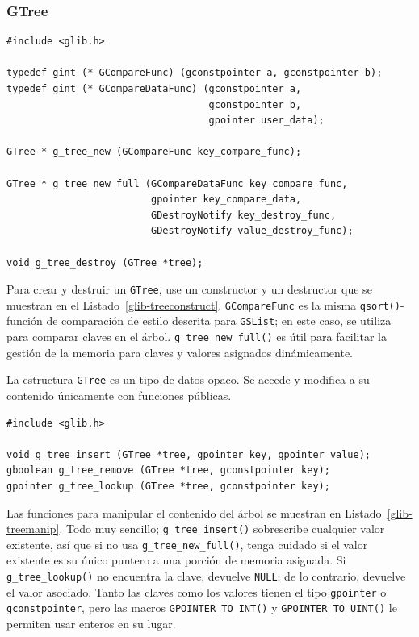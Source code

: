 \subsubsection{GTree}

\begin{lstlisting}[float, caption={Creating and destroying balanced binary trees}, label=glib-treeconstruct]
#include <glib.h>

typedef gint (* GCompareFunc) (gconstpointer a, gconstpointer b);
typedef gint (* GCompareDataFunc) (gconstpointer a,
                                   gconstpointer b,
                                   gpointer user_data);

GTree * g_tree_new (GCompareFunc key_compare_func);

GTree * g_tree_new_full (GCompareDataFunc key_compare_func,
                         gpointer key_compare_data,
                         GDestroyNotify key_destroy_func,
                         GDestroyNotify value_destroy_func);

void g_tree_destroy (GTree *tree);
\end{lstlisting}

Para crear y destruir un \lstinline {GTree}, use un constructor y un destructor que se muestran en el Listado~\ref{glib-treeconstruct}. \lstinline{GCompareFunc} es la misma \lstinline{qsort()}-función de comparación de estilo descrita para \lstinline{GSList}; en este caso, se utiliza para comparar claves en el árbol. \lstinline{g_tree_new_full()} es útil para facilitar la gestión de la memoria para claves y valores asignados dinámicamente.

La estructura \lstinline{GTree} es un tipo de datos opaco. Se accede y modifica a su contenido únicamente con funciones públicas.

\begin{lstlisting}[float, caption={Manipulating \lstinline{GTree} contents}, label=glib-treemanip]
#include <glib.h>

void g_tree_insert (GTree *tree, gpointer key, gpointer value);
gboolean g_tree_remove (GTree *tree, gconstpointer key);
gpointer g_tree_lookup (GTree *tree, gconstpointer key);
\end{lstlisting}

Las funciones para manipular el contenido del árbol se muestran en Listado~\ref{glib-treemanip}. Todo muy sencillo; \lstinline{g_tree_insert()} sobrescribe cualquier valor existente, así que si no usa \lstinline{g_tree_new_full()}, tenga cuidado si el valor existente es su único puntero a una porción de memoria asignada. Si \lstinline{g_tree_lookup()} no encuentra la clave, devuelve \lstinline{NULL}; de lo contrario, devuelve el valor asociado. Tanto las claves como los valores tienen el tipo \lstinline{gpointer} o \lstinline{gconstpointer}, pero las macros \lstinline{GPOINTER_TO_INT()} y \lstinline{GPOINTER_TO_UINT()} le permiten usar enteros en su lugar.

